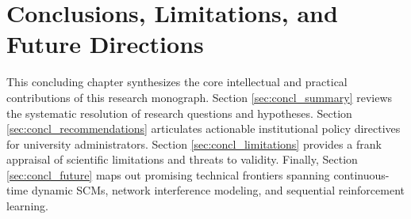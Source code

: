 \chapter{Conclusions, Limitations, and Future Directions}
\label{chap:conclusion}

This concluding chapter synthesizes the core intellectual and practical contributions of this research monograph. Section \ref{sec:concl_summary} reviews the systematic resolution of research questions and hypotheses. Section \ref{sec:concl_recommendations} articulates actionable institutional policy directives for university administrators. Section \ref{sec:concl_limitations} provides a frank appraisal of scientific limitations and threats to validity. Finally, Section \ref{sec:concl_future} maps out promising technical frontiers spanning continuous-time dynamic SCMs, network interference modeling, and sequential reinforcement learning.





